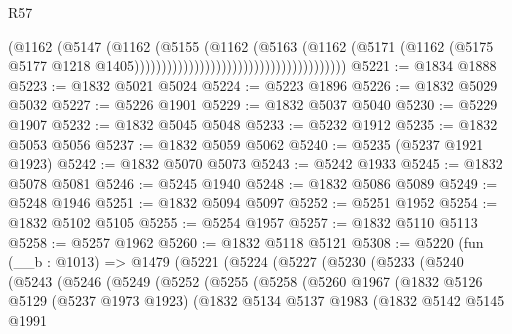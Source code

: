 \begin{lexlean}{R57}
\begin{coremodule}
                                                              (@1162
                                                                (@5147
                                                                  (@1162
                                                                    (@5155
                                                                      (@1162
                                                                        (@5163
                                                                          (@1162
                                                                            (@5171
                                                                              (@1162
                                                                                (@5175
                                                                                  @5177
                                                                                  @1218
                                                                                  @1405)))))))))))))))))))))))))))))))))))))))
@5221 := @1834 @1888
@5223 := @1832 @5021 @5024
@5224 := @5223 @1896
@5226 := @1832 @5029 @5032
@5227 := @5226 @1901
@5229 := @1832 @5037 @5040
@5230 := @5229 @1907
@5232 := @1832 @5045 @5048
@5233 := @5232 @1912
@5235 := @1832 @5053 @5056
@5237 := @1832 @5059 @5062
@5240 := @5235 (@5237 @1921 @1923)
@5242 := @1832 @5070 @5073
@5243 := @5242 @1933
@5245 := @1832 @5078 @5081
@5246 := @5245 @1940
@5248 := @1832 @5086 @5089
@5249 := @5248 @1946
@5251 := @1832 @5094 @5097
@5252 := @5251 @1952
@5254 := @1832 @5102 @5105
@5255 := @5254 @1957
@5257 := @1832 @5110 @5113
@5258 := @5257 @1962
@5260 := @1832 @5118 @5121
@5308 := @5220
    (fun (__b : @1013) =>
    @1479
      (@5221
        (@5224
          (@5227
            (@5230
              (@5233
                (@5240
                  (@5243
                    (@5246
                      (@5249
                        (@5252
                          (@5255
                            (@5258
                              (@5260
                                @1967
                                (@1832
                                  @5126
                                  @5129
                                  (@5237 @1973 @1923)
                                  (@1832
                                    @5134
                                    @5137
                                    @1983
                                    (@1832
                                      @5142
                                      @5145
                                      @1991

\end{coremodule}
\end{lexlean}
